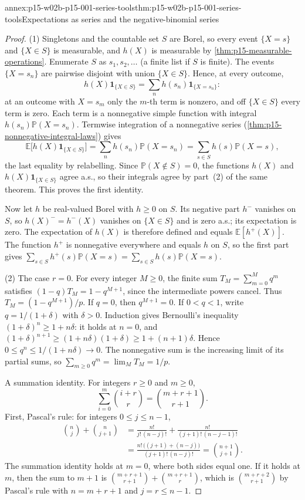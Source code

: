 \begin{annexitem}{annex:p15-w02b-p15-001-series-tools}{thm:p15-w02b-p15-001-series-tools}{Expectations as series and the negative-binomial series}
\begin{proof}
(1) Singletons and the countable set \(S\) are Borel, so every event
\(\{X=s\}\) and \(\{X\in S\}\) is measurable, and \(h(X)\) is
measurable by \cref{thm:p15-measurable-operations}. Enumerate \(S\)
as \(s_1,s_2,\ldots\) (a finite list if \(S\) is finite). The events
\(\{X=s_n\}\) are pairwise disjoint with union \(\{X\in S\}\). Hence,
at every outcome,
\[
 h(X)\mathbf1_{\{X\in S\}}=\sum_{n}h(s_n)\mathbf1_{\{X=s_n\}}:
\]
at an outcome with \(X=s_m\) only the \(m\)-th term is nonzero, and
off \(\{X\in S\}\) every term is zero. Each term is a nonnegative
simple function with integral \(h(s_n)\mathbb P(X=s_n)\). Termwise
integration of a nonnegative series
(\cref{thm:p15-nonnegative-integral-laws}) gives
\[
 \mathbb E\bigl[h(X)\mathbf1_{\{X\in S\}}\bigr]
   =\sum_nh(s_n)\mathbb P(X=s_n)=\sum_{s\in S}h(s)\mathbb P(X=s),
\]
the last equality by relabelling. Since
\(\mathbb P(X\notin S)=0\), the functions \(h(X)\) and
\(h(X)\mathbf1_{\{X\in S\}}\) agree a.s., so their integrals agree by
part~(2) of the same theorem. This proves the first identity.

Now let \(h\) be real-valued Borel with \(h\geq0\) on \(S\). Its
negative part \(h^-\) vanishes on \(S\), so
\(h(X)^-=h^-(X)\) vanishes on \(\{X\in S\}\) and is zero a.s.;
its expectation is zero. The expectation of \(h(X)\) is therefore
defined and equals \(\mathbb E[h^+(X)]\). The function \(h^+\) is
nonnegative everywhere and equals \(h\) on \(S\), so the first part
gives \(\sum_{s\in S}h^+(s)\mathbb P(X=s)=\sum_{s\in S}h(s)\mathbb P(X=s)\).

(2) The case \(r=0\). For every integer \(M\geq0\), the finite sum
\(T_M=\sum_{m=0}^Mq^m\) satisfies \((1-q)T_M=1-q^{M+1}\), since the
intermediate powers cancel. Thus \(T_M=(1-q^{M+1})/p\). If \(q=0\),
then \(q^{M+1}=0\). If \(0<q<1\), write \(q=1/(1+\delta)\) with
\(\delta>0\). Induction gives Bernoulli's inequality
\((1+\delta)^n\geq1+n\delta\): it holds at \(n=0\), and
\((1+\delta)^{n+1}\geq(1+n\delta)(1+\delta)\geq1+(n+1)\delta\).
Hence \(0\leq q^n\leq1/(1+n\delta)\to0\). The nonnegative sum is the
increasing limit of its partial sums, so
\(\sum_{m\geq0}q^m=\lim_MT_M=1/p\).

A summation identity. For integers \(r\geq0\) and \(m\geq0\),
\[
 \sum_{i=0}^m\binom{i+r}{r}=\binom{m+r+1}{r+1}.
\]
First, Pascal's rule: for integers \(0\leq j\leq n-1\),
\[
 \begin{aligned}
 \binom nj+\binom n{j+1}
 &=\frac{n!}{j!\,(n-j)!}+\frac{n!}{(j+1)!\,(n-j-1)!}\\
 &=\frac{n!\,\bigl((j+1)+(n-j)\bigr)}{(j+1)!\,(n-j)!}
 =\binom{n+1}{j+1}.
 \end{aligned}
\]
The summation identity holds at \(m=0\), where both sides equal one.
If it holds at \(m\), then the sum to \(m+1\) is
\(\binom{m+r+1}{r+1}+\binom{m+r+1}{r}\), which is
\(\binom{m+r+2}{r+1}\) by Pascal's rule with \(n=m+r+1\) and
\(j=r\leq n-1\).


\end{proof}
\end{annexitem}
